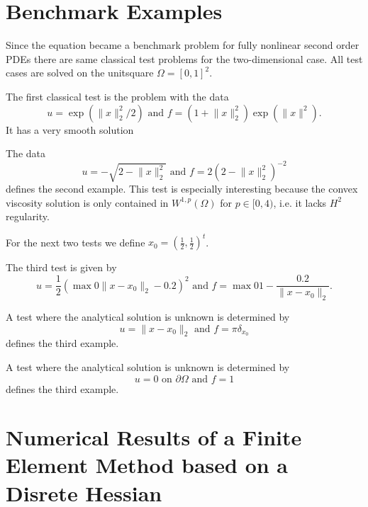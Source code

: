 \section{Benchmark Examples}

Since the \MA equation became a benchmark problem for fully nonlinear second order PDEs there are same classical test problems for the two-dimensional case. All test cases are solved on the unitsquare $\Omega=[0,1]^2$.

\begin{test} \label{test smooth}
The first classical \MA test is the problem with the data
\[
	u=\exp( \lVert x \rVert_2^2  /2) 
	\text { and } 
	f = (1 + \lVert x \rVert_2^2) \exp( \lVert x \rVert^2).
\]
It has a very smooth solution 

\end{test}

\begin{test}\label{test sqrt}
The data
\[
	u = - \sqrt{ 2-  \lVert x \rVert_2^2}
	\text { and } 
	f = 2\left( 2-  \lVert x \rVert_2^2 \right)^{-2}
\]
defines the second example. This test is especially interesting because the convex viscosity solution is only contained in $W^{1,p}(\Omega) $ for $p \in [0,4)$\cite{DG2006a}, i.e. it lacks $H^2$ regularity.
\end{test}

For the next two tests we define $x_0 = \left(\frac 1 2, \frac 1 2  \right)^t$.

\begin{test}\label{test singularity}
The third \MA test is given by
\[
	u=\frac 1 2 \left( \max 0 {\lVert x - x_0 \rVert_2-0.2 }  \right)^2 
	\text { and } 
	f = \max 0 {1-\frac {0.2} {\lVert x - x_0 \rVert_2} }.
\]
\end{test}


\begin{test}\label{test dirac}
A test where the analytical solution is unknown is determined by
\[
	u = \lVert x - x_0 \rVert_2
	\text { and } 
	f = \pi \delta_{x_0}
\]
defines the third example. 
\end{test}


\begin{test}\label{test rhsConst}
A test where the analytical solution is unknown is determined by
\[
	u = 0 \text{ on } \partial \Omega
	\text { and } 
	f = 1
\]
defines the third example.
\end{test}


\section{Numerical Results of a Finite Element Method based on a Disrete Hessian}

